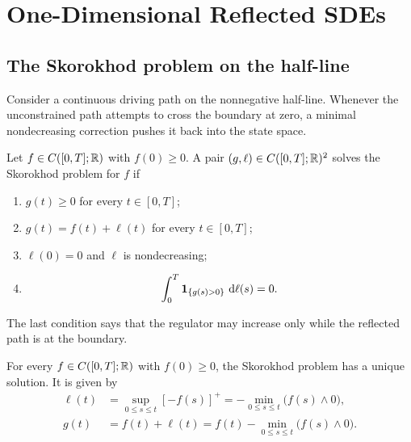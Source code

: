 \chapter[One-Dimensional Reflected SDEs]{One-Dimensional Reflected SDEs}

\section{The Skorokhod problem on the half-line}

Consider a continuous driving path on the nonnegative half-line. Whenever the
unconstrained path attempts to cross the boundary at zero, a minimal
nondecreasing correction pushes it back into the state space.

\begin{definition}[Skorokhod problem on $[0,\infty)$]
Let $f\in C([0,T];\mathbb R)$ with $f(0)\geq 0$. A pair
$(g,\ell)\in C([0,T];\mathbb R)^2$ solves the Skorokhod problem for $f$ if
\begin{enumerate}[label=(\roman*)]
  \item $g(t)\geq 0$ for every $t\in[0,T]$;
  \item $g(t)=f(t)+\ell(t)$ for every $t\in[0,T]$;
  \item $\ell(0)=0$ and $\ell$ is nondecreasing;
  \item
  \[
    \int_0^T \mathbf 1_{\{g(s)>0\}}\,\mathop{}\!\mathrm d\ell(s)=0.
  \]
\end{enumerate}
The last condition says that the regulator may increase only while the
reflected path is at the boundary.
\end{definition}

\begin{theorem}
For every $f\in C([0,T];\mathbb R)$ with $f(0)\geq0$, the Skorokhod problem has a
unique solution. It is given by
\begin{align}
  \ell(t)
    &=\sup_{0\leq s\leq t}[-f(s)]^+
      =-\min_{0\leq s\leq t}\bigl(f(s)\wedge0\bigr), \label{eq:one-d-regulator}\\
  g(t)
    &=f(t)+\ell(t)
      =f(t)-\min_{0\leq s\leq t}\bigl(f(s)\wedge0\bigr). \label{eq:one-d-map}
\end{align}
\end{theorem}

